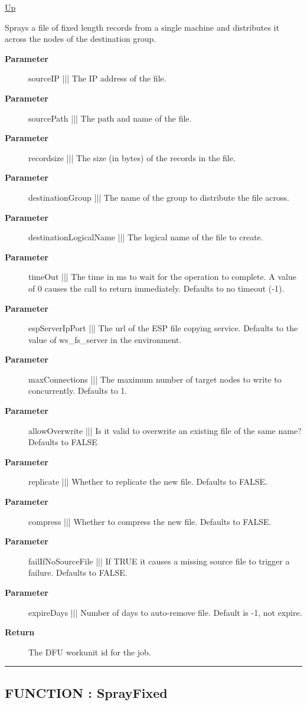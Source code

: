 \hyperlink{ecldoc:File}{Up}

\par
Sprays a file of fixed length records from a single machine and distributes it across the nodes of the destination group.

\par
\begin{description}
\item [\textbf{Parameter}] sourceIP ||| The IP address of the file.
\item [\textbf{Parameter}] sourcePath ||| The path and name of the file.
\item [\textbf{Parameter}] recordsize ||| The size (in bytes) of the records in the file.
\item [\textbf{Parameter}] destinationGroup ||| The name of the group to distribute the file across.
\item [\textbf{Parameter}] destinationLogicalName ||| The logical name of the file to create.
\item [\textbf{Parameter}] timeOut ||| The time in ms to wait for the operation to complete. A value of 0 causes the call to return immediately. Defaults to no timeout (-1).
\item [\textbf{Parameter}] espServerIpPort ||| The url of the ESP file copying service. Defaults to the value of ws\_fs\_server in the environment.
\item [\textbf{Parameter}] maxConnections ||| The maximum number of target nodes to write to concurrently. Defaults to 1.
\item [\textbf{Parameter}] allowOverwrite ||| Is it valid to overwrite an existing file of the same name? Defaults to FALSE
\item [\textbf{Parameter}] replicate ||| Whether to replicate the new file. Defaults to FALSE.
\item [\textbf{Parameter}] compress ||| Whether to compress the new file. Defaults to FALSE.
\item [\textbf{Parameter}] failIfNoSourceFile ||| If TRUE it causes a missing source file to trigger a failure. Defaults to FALSE.
\item [\textbf{Parameter}] expireDays ||| Number of days to auto-remove file. Default is -1, not expire.
\item [\textbf{Return}] The DFU workunit id for the job.
\end{description}

\rule{\textwidth}{0.4pt}
\subsection*{FUNCTION : SprayFixed}
\hypertarget{ecldoc:file.sprayfixed}{}

